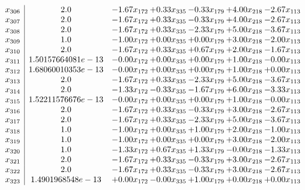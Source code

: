 \documentclass[8pt]{article}
\begin{document}
\[\begin{array}{c| c c@{\hskip 2pt} c@{\hskip 2pt} c@{\hskip 2pt} c@{\hskip 2pt} c@{\hskip 2pt} }
 x_{306}   &  2.0 & -1.67 x_{172} & +  0.33 x_{335} & -0.33 x_{179} & +  4.00 x_{218} & -2.67 x_{113}\\
 x_{307}   &  2.0 & -1.67 x_{172} & +  0.33 x_{335} & -0.33 x_{179} & +  4.00 x_{218} & -2.67 x_{113}\\
 x_{308}   &  2.0 & -1.67 x_{172} & +  0.33 x_{335} & -2.33 x_{179} & +  5.00 x_{218} & -3.67 x_{113}\\
 x_{309}   &  1.0 & -1.00 x_{172} & +  0.00 x_{335} & +  0.00 x_{179} & +  3.00 x_{218} & -2.00 x_{113}\\
 x_{310}   &  2.0 & -1.67 x_{172} & +  0.33 x_{335} & +  0.67 x_{179} & +  2.00 x_{218} & -1.67 x_{113}\\
 x_{311}   &  1.50157664081e-13 & -0.00 x_{172} & +  0.00 x_{335} & +  0.00 x_{179} & +  1.00 x_{218} & -0.00 x_{113}\\
 x_{312}   &  1.68060010353e-13 & -0.00 x_{172} & +  0.00 x_{335} & +  0.00 x_{179} & +  1.00 x_{218} & +  0.00 x_{113}\\
 x_{313}   &  2.0 & -1.67 x_{172} & +  0.33 x_{335} & -2.33 x_{179} & +  5.00 x_{218} & -3.67 x_{113}\\
 x_{314}   &  2.0 & -1.33 x_{172} & -0.33 x_{335} & -1.67 x_{179} & +  6.00 x_{218} & -3.33 x_{113}\\
 x_{315}   &  1.52211576676e-13 & -0.00 x_{172} & +  0.00 x_{335} & +  0.00 x_{179} & +  1.00 x_{218} & -0.00 x_{113}\\
 x_{316}   &  2.0 & -1.67 x_{172} & +  0.33 x_{335} & -0.33 x_{179} & +  3.00 x_{218} & -2.67 x_{113}\\
 x_{317}   &  2.0 & -1.67 x_{172} & +  0.33 x_{335} & -2.33 x_{179} & +  5.00 x_{218} & -3.67 x_{113}\\
 x_{318}   &  1.0 & -1.00 x_{172} & +  0.00 x_{335} & +  1.00 x_{179} & +  2.00 x_{218} & -1.00 x_{113}\\
 x_{319}   &  1.0 & -1.00 x_{172} & +  0.00 x_{335} & +  0.00 x_{179} & +  3.00 x_{218} & -2.00 x_{113}\\
 x_{320}   &  1.0 & -1.33 x_{172} & +  0.67 x_{335} & +  1.33 x_{179} & -0.00 x_{218} & -1.33 x_{113}\\
 x_{321}   &  2.0 & -1.67 x_{172} & +  0.33 x_{335} & -0.33 x_{179} & +  3.00 x_{218} & -2.67 x_{113}\\
 x_{322}   &  2.0 & -1.67 x_{172} & +  0.33 x_{335} & -0.33 x_{179} & +  3.00 x_{218} & -2.67 x_{113}\\
 x_{323}   &  1.4901968548e-13 & +  0.00 x_{172} & -0.00 x_{335} & +  1.00 x_{179} & +  0.00 x_{218} & +  0.00 x_{113}\\

\end{array}\]
\end{document}

